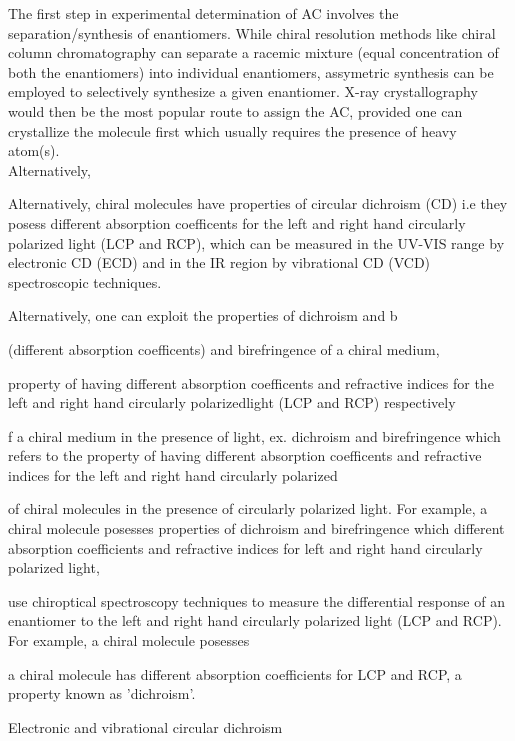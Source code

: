 The first step in experimental determination of AC involves the separation/synthesis of 
enantiomers. While chiral resolution methods like chiral column chromatography can separate 
a racemic mixture (equal concentration of both the enantiomers) into individual enantiomers,
assymetric synthesis can be employed to selectively synthesize a given enantiomer.
X-ray crystallography would then be the most popular route to assign the AC, provided one
can crystallize the molecule first which usually requires the presence of heavy atom(s).
\\
Alternatively, 

Alternatively, chiral molecules have properties of circular dichroism (CD) i.e they posess different absorption 
coefficents for the left and right hand circularly polarized light (LCP and RCP), which can be measured 
in the UV-VIS range by electronic CD (ECD) and in the IR region by vibrational CD (VCD) spectroscopic 
techniques. 



Alternatively, one can exploit the properties of dichroism and b

(different absorption coefficents) 
and birefringence of a chiral medium,



property of having different absorption coefficents and refractive indices for the left and right hand circularly polarizedlight (LCP and RCP) respectively

f a chiral medium in the presence
of light, ex. dichroism and birefringence which refers to the property of having different 
absorption coefficents and refractive indices for the left and right hand circularly polarized 


of chiral molecules in the presence of
circularly polarized light. For example, a chiral molecule posesses properties of dichroism
and birefringence which different absorption
coefficients and refractive indices for left and right hand circularly polarized light,



use chiroptical spectroscopy techniques to measure the 
differential response of an enantiomer to the left and right hand circularly polarized 
light (LCP and RCP). For example, a chiral molecule  posesses 

a chiral molecule has different absorption coefficients for LCP
and RCP, a property known as 'dichroism'.


 Electronic and vibrational circular dichroism 

